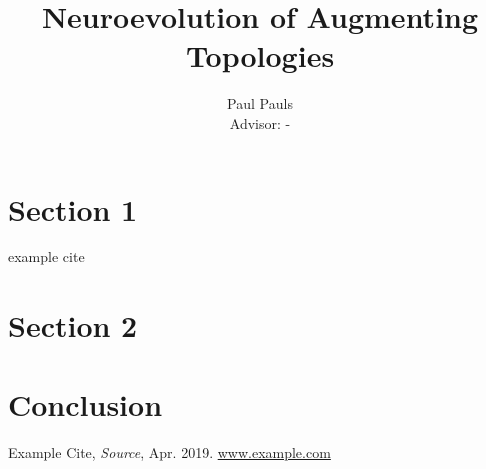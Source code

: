 \documentclass[journal, a4paper]{IEEEtran}
\begin{document}
	\title{Neuroevolution of Augmenting Topologies}
	\author{Paul Pauls\\
			Advisor: -}
	\maketitle

\begin{abstract}
\blindtext
\end{abstract}


\section{Section 1}

\blindtext
example cite \cite{cite01}




\section{Section 2}

\blindtext




\section{Conclusion}

\blindtext




\begin{thebibliography}{5}

	Example Cite, {\em Source}, Apr. 2019.
	\url{www.example.com}

\end{thebibliography}
\end{document}
